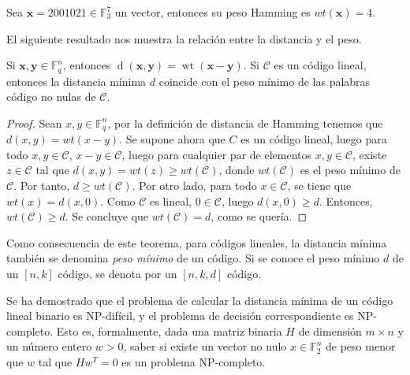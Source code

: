 \begin{exampleth}
    Sea $\mathbf{x} = 2001021 \in \mathbb{F}_3^7$ un vector, entonces su peso Hamming es $wt(\mathbf{x}) = 4$.
\end{exampleth}

El siguiente resultado nos muestra la relación entre la distancia y el peso.

\begin{theorem}
    Si $\mathbf{x}, \mathbf{y} \in \mathbb{F}_q^n$, entonces $\operatorname{d}(\mathbf{x},\mathbf{y}) = \operatorname{wt}(\mathbf{x}-\mathbf{y})$. Si $\mathcal{C}$ es un código lineal, entonces la distancia mínima $d$ coincide con el peso mínimo de las palabras código no nulas de $\mathcal{C}$.
\end{theorem}

\begin{proof}
    Sean $x,y \in \mathbb{F}_q^n$, por la definición de distancia de Hamming tenemos que $d(x,y) = wt(x-y)$. Se supone ahora que $C$ es un código lineal, luego para todo $x,y \in \mathcal{C}$, $x-y \in \mathcal{C}$, luego para cualquier par de elementos $x,y \in \mathcal{C}$, existe $z \in \mathcal{C}$ tal que $d(x,y) = wt(z) \geq wt(\mathcal{C})$, donde $wt(\mathcal{C})$ es el peso mínimo de $\mathcal{C}$. Por tanto, $d \geq wt(\mathcal{C})$. Por otro lado, para todo $x \in \mathcal{C}$, se tiene que $wt(x) = d(x,0)$. Como $\mathcal{C}$ es lineal, $0 \in \mathcal{C}$, luego $d(x,0) \geq d$. Entonces, $wt(\mathcal{C}) \geq d$. Se concluye que $wt(\mathcal{C}) = d$, como se quería.
\end{proof}

Como consecuencia de este teorema, para códigos lineales, la distancia mínima también se denomina \emph{peso mínimo} de un código. Si se conoce el peso mínimo $d$ de un $[n,k]$ código, se denota por un $[n,k,d]$ código.

Se ha demostrado que el problema de calcular la distancia mínima de un código lineal binario es NP-difícil, y el problema de decisión correspondiente es NP-completo. Esto es, formalmente, dada una matriz binaria $H$ de dimensión $m \times n$ y un número entero $w > 0$, saber si existe un vector no nulo $x \in \mathbb{F}_2^n$ de peso menor que $w$ tal que $Hw^T = 0$ es un problema NP-completo. 


